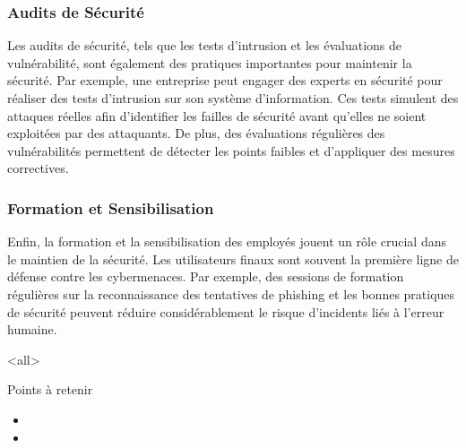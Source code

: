 \subsubsection{Audits de Sécurité}

Les audits de sécurité, tels que les tests d'intrusion et les évaluations de vulnérabilité, sont également des pratiques importantes pour maintenir la sécurité. Par exemple, une entreprise peut engager des experts en sécurité pour réaliser des tests d'intrusion sur son système d'information. Ces tests simulent des attaques réelles afin d'identifier les failles de sécurité avant qu'elles ne soient exploitées par des attaquants. De plus, des évaluations régulières des vulnérabilités permettent de détecter les points faibles et d'appliquer des mesures correctives.

\subsubsection{Formation et Sensibilisation}

Enfin, la formation et la sensibilisation des employés jouent un rôle crucial dans le maintien de la sécurité. Les utilisateurs finaux sont souvent la première ligne de défense contre les cybermenaces. Par exemple, des sessions de formation régulières sur la reconnaissance des tentatives de phishing et les bonnes pratiques de sécurité peuvent réduire considérablement le risque d'incidents liés à l'erreur humaine.


\mode<all>{\texframe
{Points à retenir} %
{} %
{
\begin{itemize}
    \item
    \item
\end{itemize}
}}
